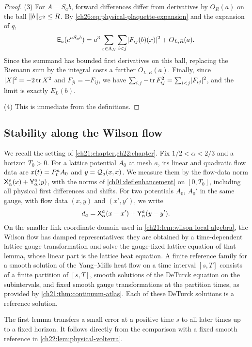 \begin{proof}
(3) For $A=S_ab$, forward differences differ from derivatives by $O_R(a)$ on the ball $\lVert b\rVert_{C^2}\le R$. By \eqref{ch26:eq:physical-plaquette-expansion} and the expansion of $q$,
\[
 \mathsf E_a(e^{aS_ab})=a^3\sum_{x\in\Lambda_{N}}\sum_{i<j}\lvert F_{ij}(b)(x)\rvert^2+O_{L,R}(a).
\]
Since the summand has bounded first derivatives on this ball, replacing the Riemann sum by the integral costs a further $O_{L,R}(a)$. Finally, since $\lvert X\rvert^2=-2\operatorname{tr} X^2$ and $F_{ji}=-F_{ij}$, we have $\sum_{i,j}-\operatorname{tr} F_{ij}^2=\sum_{i<j}\lvert F_{ij}\rvert^2$, and the limit is exactly $E_L(b)$.

(4) This is immediate from the definitions.
\end{proof}

\subsection{Stability along the Wilson flow}

We recall the setting of \cref{ch21:chapter,ch22:chapter}. Fix $1/2<\alpha<2/3$ and a horizon $T_0>0$. For a lattice potential $A_0$ at mesh $a$, its linear and quadratic flow data are $x(t)=P_{t}^{a} A_0$ and $y=\mathcal Q_{a}(x,x)$. We measure them by the flow-data norm $\mathsf X_{\alpha}^{a}(x)+\mathsf Y_{\alpha}^{a}(y)$, with the norms of \cref{ch01:def:enhancement} on $[0,T_0]$, including all physical first differences and shifts. For two potentials $A_0$, $A_0'$ in the same gauge, with flow data $(x,y)$ and $(x',y')$, we write
\[
 d_a=\mathsf X_{\alpha}^{a}(x-x')+\mathsf Y_{\alpha}^{a}(y-y').
\]
On the smaller link coordinate domain used in \cref{ch21:lem:wilson-local-algebra}, the Wilson flow has damped representatives: they are obtained by a time-dependent lattice gauge transformation and solve the gauge-fixed lattice equation of that lemma, whose linear part is the lattice heat equation. A finite reference family for a smooth solution of the Yang--Mills heat flow on a time interval $[s,T]$ consists of a finite partition of $[s,T]$, smooth solutions of the DeTurck equation on the subintervals, and fixed smooth gauge transformations at the partition times, as provided by \cref{ch21:thm:continuum-atlas}. Each of these DeTurck solutions is a reference solution.

The first lemma transfers a small error at a positive time $s$ to all later times up to a fixed horizon. It follows directly from the comparison with a fixed smooth reference in \cref{ch22:lem:physical-volterra}.

